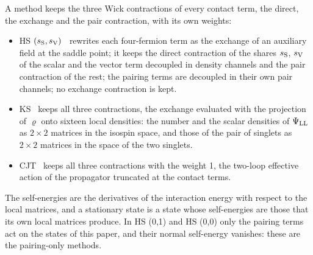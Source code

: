 \documentclass[aps,prd,onecolumn,superscriptaddress,nofootinbib,floatfix,longbibliography]{revtex4-2}
\newcommand{\LL}{{\rm LL}}
\begin{document}
A method keeps the three Wick contractions of every contact term, the direct, the exchange and the pair contraction,
with its own weights:
\begin{itemize}
\item HS $(s_{\rm S},s_{\rm V})$~\cite{Hubbard1959,Stratonovich1957} rewrites each four-fermion term as the exchange of an
auxiliary field at the saddle point; it keeps the direct contraction of the shares $s_{\rm S}$, $s_{\rm V}$ of the scalar and
the vector term decoupled in density channels and the pair contraction of the rest; the pairing terms are decoupled in
their own pair channels; no exchange contraction is kept.
\item KS~\cite{HohenbergKohn1964,KohnSham1965} keeps all three contractions, the exchange evaluated with the projection of
$\varrho$ onto sixteen local densities: the number and the scalar densities of $\Psi_\LL$ as $2\times2$ matrices in the
isospin space, and those of the pair of singlets as $2\times2$ matrices in the space of the two singlets.
\item CJT~\cite{CJT1974} keeps all three contractions with the weight 1, the two-loop effective action of the propagator
truncated at the contact terms.
\end{itemize}
The self-energies are the derivatives of the interaction energy with respect to the local matrices, and a stationary
state is a state whose self-energies are those that its own local matrices produce. In HS (0,1) and HS (0,0) only the
pairing terms act on the states of this paper, and their normal self-energy vanishes: these are the pairing-only methods.
\end{document}
